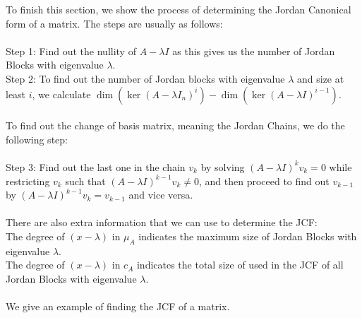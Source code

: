\documentclass[a4paper]{article}
\begin{document}
To finish this section, we show the process of determining the Jordan Canonical form of a matrix. The steps are usually as follows: \\~\\
Step 1: Find out the nullity of $A-\lambda I$ as this gives us the number of Jordan Blocks with eigenvalue $\lambda$. \\
Step 2: To find out the number of Jordan blocks with eigenvalue $\lambda$ and size at least $i$, we calculate $\dim(\ker(A-\lambda I_n)^i)-\dim(\ker(A-\lambda I)^{i-1})$. \\~\\
To find out the change of basis matrix, meaning the Jordan Chains, we do the following step: \\~\\
Step 3: Find out the last one in the chain $v_k$ by solving $(A-\lambda I)^kv_k=0$ while restricting $v_k$ such that $(A-\lambda I)^{k-1}v_k\neq 0$, and then proceed to find out $v_{k-1}$ by $(A-\lambda I)^{k-1}v_k=v_{k-1}$ and vice versa. \\~\\

There are also extra information that we can use to determine the JCF: \\
The degree of $(x-\lambda)$ in $\mu_A$ indicates the maximum size of Jordan Blocks with eigenvalue $\lambda$. \\
The degree of $(x-\lambda)$ in $c_A$ indicates the total size of used in the JCF of all Jordan Blocks with eigenvalue $\lambda$. \\~\\

We give an example of finding the JCF of a matrix. 
\end{document}
